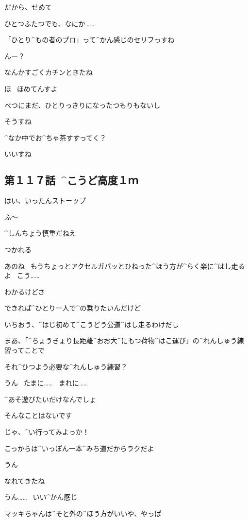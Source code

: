 \Sensei だから、せめて

\Sensei ひとつふたつでも、なにか……

\page[87]
\Ojisan 「ひとり^{もの}{者}のプロ」って^{かん}{感}じのセリフっすね

\Sensei んー？

\Sensei なんかすごくカチンときたね

\Ojisan ほ
\ ほめてんすよ

\page[88]
\Sensei べつにまだ、ひとりっきりになったつもりもないし

\Ojisan そうすね

\Sensei ^{なか}{中}でお^{ちゃ}{茶}すすってく？

\Ojisan いいすね


\subsection{第１１７話\ ^{こうど}{高度}１ｍ}

\page[91]
\Alpha はい、いったんストーップ

\Makki ふ〜

\Alpha ^{しんちょう}{慎重}だねえ

\Makki つかれる

\page[92]
\Alpha あのね
\ もうちょっとアクセルガバッとひねった^{ほう}{方}が^{らく}{楽}に^{はし}{走}るよ
\ こう……

\Makki わかるけどさ

\Makki できれば^{ひとり}{一人}で^{の}{乗}りたいんだけど

\Alpha いちおう、^{はじ}{初}めて^{こうどう}{公道}^{はし}{走}るわけだし

\Alpha まあ、「^{ちょうきょり}{長距離}^{おお}{大}^{にもつ}{荷物}^{はこ}{運}び」の^{れんしゅう}{練習}ってことで

\Makki それ^{ひつよう}{必要}な^{れんしゅう}{練習}？

\page[93]
\Alpha うん
\ たまに……
\ まれに……

\Makki ^{あそ}{遊}びたいだけなんでしょ

\Alpha そんなことはないです

\Alpha じゃ、^{い}{行}ってみよっか！

\Alpha こっからは^{いっぽん}{一本}^{みち}{道}だからラクだよ

\Makki うん

\page[94]
\Alpha なれてきたね

\Makki うん……
\ いい^{かん}{感}じ

\page[95]
\Alpha マッキちゃんは^{そと}{外}の^{ほう}{方}がいいや、やっぱ

